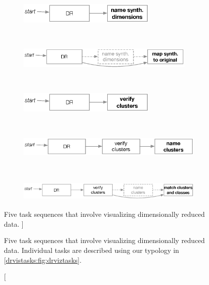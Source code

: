 \begin{figure}
	\centering
	\begin{subfigure}[t]{\textwidth}
	    \centering
        \includegraphics[height=1cm]{figures/drviztasks-name-dims.eps}
    \end{subfigure}
    ~
    \begin{subfigure}[t]{\textwidth}
	    \centering
        \includegraphics[height=1cm]{figures/drviztasks-map-dims.eps}
    \end{subfigure}
    ~
    \begin{subfigure}[t]{\textwidth}
	    \centering
        \includegraphics[height=1cm]{figures/drviztasks-identify-clusters.eps}
    \end{subfigure}
    ~
    \begin{subfigure}[t]{\textwidth}
	    \centering
        \includegraphics[height=1cm]{figures/drviztasks-name-clusters.eps}
    \end{subfigure}
    ~
    \begin{subfigure}[t]{\textwidth}
	    \centering
        \includegraphics[height=1cm]{figures/drviztasks-match-clusters.eps}
    \end{subfigure}
	\caption
	[
	    Five task sequences that involve visualizing dimensionally reduced data.
	]
	{
    	
    	Five task sequences that involve visualizing dimensionally reduced data. Individual tasks are described using our typology in \autoref{drvistasks:fig:drviztasks}.
	}
	\centering
	\label{drvistasks:sequences}
\end{figure}


